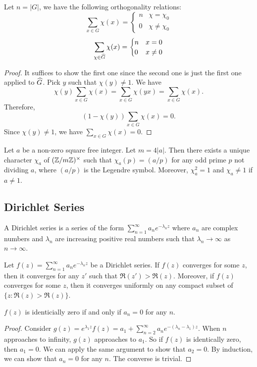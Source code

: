 \documentclass[15pt]{scrartcl}
\begin{document}
\begin{proposition}
    Let $n=|G|$, we have the following orthogonality relations:
    \[\sum_{x\in G}\chi(x)=\begin{cases}
    n & \chi=\chi_0
    \\
    0 & \chi\neq \chi_0
\end{cases}\]
    \[\sum_{\chi\in \widehat{G}}\chi(x)=\begin{cases}
        n & x=0
        \\
        0 & x\neq 0
    \end{cases}\]
\end{proposition}
\begin{proof}
    It suffices to show the first one since the second one is just the first one applied to $\widehat{G}$. Pick $y$ such that $\chi(y)\neq 1$. We have
    \[\chi(y)\sum_{x\in G}\chi(x) =\sum_{x\in G}\chi(yx) =\sum_{x\in G}\chi(x).\]
    Therefore, 
    \[(1-\chi(y))\sum_{x\in G}\chi(x) = 0.\]
    Since $\chi(y)\neq 1$, we have $\sum_{x\in G}\chi(x) = 0$.
\end{proof}
\begin{proposition}\label{prop:6.6}
    Let $a$ be a non-zero square free integer. Let $m=4|a|$. Then there exists a unique character $\chi_a$ of $(\mathbb Z/m\mathbb Z)^\times$ such that $\chi_a(p)=(a/p)$ for any odd prime $p$ not dividing $a$, where $(a/p)$ is the Legendre symbol. Moreover, $\chi_a^2=1$ and $\chi_a\neq 1$ if $a\neq 1$. 
\end{proposition}
\subsection{Dirichlet Series}
\begin{definition}
    A Dirichlet series is a series of the form $\sum_{n=1}^\infty a_ne^{-\lambda_n z}$ where $a_n$ are complex numbers and $\lambda_n$ are increasing positive real numbers such that $\lambda_n\to \infty$ as $n\to \infty$. 
\end{definition}
\begin{proposition}
    Let $f(z)=\sum_{n=1}^\infty a_ne^{-\lambda_n z}$ be a Dirichlet series. If $f(z)$ converges for some $z$, then it converges for any $z'$ such that $\Re(z')>\Re(z)$. Moreover, if $f(z)$ converges for some $z$, then it converges uniformly on any compact subset of $\{z: \Re(z)>\Re(z)\}$.
\end{proposition}
\begin{corollary}
    $f(z)$ is identicially zero if and only if $a_n=0$ for any $n$.
\end{corollary}
\begin{proof}
    Consider $g(z)=e^{\lambda_1 z}f(z)=a_1+\sum_{n=2}^\infty a_ne^{-(\lambda_n-\lambda_1)z}$. When $n$ approaches to infinity, $g(z)$ approaches to $a_1$. So if $f(z)$ is identically zero, then $a_1=0$. We can apply the same argument to show that $a_2=0$. By induction, we can show that $a_n=0$ for any $n$. The converse is trivial.
\end{proof}
\end{document}
